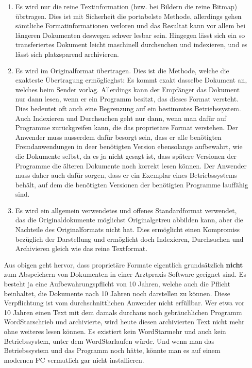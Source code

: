 \documentclass[a4paper]{scrartcl}
\begin{document}
\begin{enumerate}
\item Es wird nur die reine Textinformation (bzw. bei Bildern die reine Bitmap) übrtragen. Dies ist mit Sicherheit die portabelste Methode, allerdings gehen sämtliche Formatinformationen verloren und das Resultat kann vor allem bei längeren Dokumenten deswegen schwer lesbar sein. Hingegen lässt sich ein so transferiertes Dokument leicht maschinell durchsuchen und indexieren, und es lässt sich platzsparend archivieren.
    
\item Es wird im Originalformat übertragen. Dies ist die Methode, welche die exakteste Übertragung ermöglicghst: Es kommt exakt dasselbe Dokument an, welches beim Sender vorlag. Allerdings kann der Empfänger das Dokument nur dann lesen, wenn er ein Programm besitzt, das dieses Format versteht. Dies bedeutet oft auch eine Begrenzung auf ein bestimmtes Betriebssystem.
    Auch Indexieren und Durchsuchen geht nur dann, wenn man dafür auf Programme zurückgreifen kann, die das proprietäre Format verstehen.
    Der Anwender muss ausserdem dafür besorgt sein, dass er alle benötigten Fremdanwendungen in deer benötigten Version ebensolange aufbewahrt, wie die Dokumente selbst, da es ja nicht gesagt ist, dass spätere Versionen der Programme die älteren Dokumente noch korrekt lesen können. Der Anwender muss daher auch dafür sorgen, dass er ein Exemplar eines Betriebssystems behält, auf dem die benötigten Versionen der benötigten Programme lauffähig sind.
\item Es wird ein allgemein verwendetes und offenes Standardformat verwendet, das die Originaldokumente möglichst Originalgetreu abbilden kann, aber die Nachteile des Originalformats nicht hat. Dies ermöglicht einen Kompromiss bezüglich der Darstellung und ermöglicht doch Indexieren, Durchsuchen und Archivieren gleich wie das reine Textformat.
\end{enumerate}

Aus obigen geht hervor, dass proprietäre Formate eigentlich grundsätzlich \textbf{nicht} zum Abspeichern von Dokumenten in einer Arztpraxis-Software geeignet sind. Es besteht ja eine Aufbewahrungspflicht von 10 Jahren, welche auch die Pflicht beinhaltet, die Dokumente nach 10 Jahren noch darstellen zu können. Diese Verpflichtung ist vom durchschnittlichen Anwender nicht erfüllbar. Wer etwa vor 10 Jahren einen Text mit dem damals durchaus noch gebräuchlichen Programm WordStar\texttrademark schrieb und archivierte, wird heute diesen archivierten Text nicht mehr ohne weiteres lesen können. Es existiert kein WordStar\texttrademark mehr und auch kein Betriebssystem, unter dem WordStar\texttrademark laufen würde. Und wenn man das Betriebssystem und das Programm noch hätte, könnte man es auf einem modernen PC vermutlich gar nicht installieren.
\end{document}
